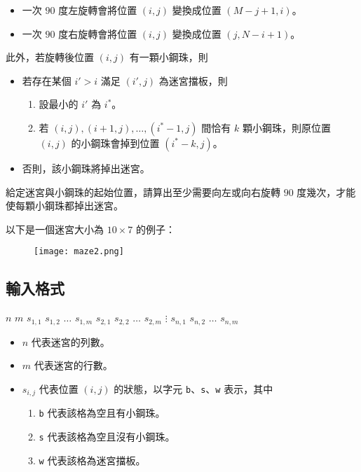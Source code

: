 \begin{itemize}
\tightlist
\item
  一次 \(90\) 度左旋轉會將位置 \((i, j)\) 變換成位置 \((M-j+1, i)\)。
\item
  一次 \(90\) 度右旋轉會將位置 \((i, j)\) 變換成位置 \((j, N-i+1)\)。
\end{itemize}

\noindent 此外，若旋轉後位置 \((i, j)\) 有一顆小鋼珠，則

\begin{itemize}
\tightlist
\item
  若存在某個 \(i' > i\) 滿足 \((i', j)\) 為迷宮擋板，則

  \begin{enumerate}
  \def\labelenumi{\arabic{enumi}.}
  \tightlist
  \item
    設最小的 \(i'\) 為 \(i^*\)。
  \item
    若 \((i, j), (i+1, j), \ldots, (i^*-1, j)\) 間恰有 \(k\)
    顆小鋼珠，則原位置 \((i, j)\) 的小鋼珠會掉到位置 \((i^*-k, j)\)。
  \end{enumerate}
\item
  否則，該小鋼珠將掉出迷宮。
\end{itemize}

給定迷宮與小鋼珠的起始位置，請算出至少需要向左或向右旋轉 \(90\)
度幾次，才能使每顆小鋼珠都掉出迷宮。

以下是一個迷宮大小為 \(10\times7\) 的例子：

\begin{figure}[h]
\centering
\texttt{[image: maze2.png]}
\caption{}
\end{figure}

\subsection{輸入格式}

\begin{format}
\f{
$n$ $m$
$s_{1, 1}$ $s_{1, 2}$ $\ldots$ $s_{1, m}$
$s_{2, 1}$ $s_{2, 2}$ $\ldots$ $s_{2, m}$
$\vdots$
$s_{n, 1}$ $s_{n, 2}$ $\ldots$ $s_{n, m}$
}
\end{format}

\begin{itemize}
\tightlist
\item
  \(n\) 代表迷宮的列數。
\item
  \(m\) 代表迷宮的行數。
\item
  \(s_{i, j}\) 代表位置 \((i, j)\) 的狀態，以字元
  \texttt{b}、\texttt{s}、\texttt{w} 表示，其中

  \begin{enumerate}
  \def\labelenumi{\arabic{enumi}.}
  \tightlist
  \item
    \texttt{b} 代表該格為空且有小鋼珠。
  \item
    \texttt{s} 代表該格為空且沒有小鋼珠。
  \item
    \texttt{w} 代表該格為迷宮擋板。
  \end{enumerate}
\end{itemize}


